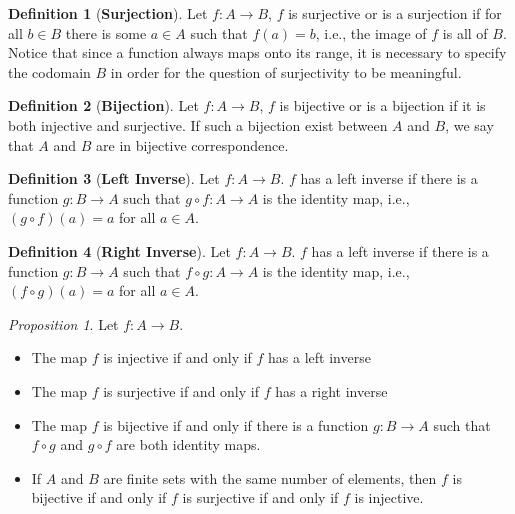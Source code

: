 \documentclass[paper=a4, fontsize=11pt]{scrartcl}
\numberwithin{equation}{section}		%
\numberwithin{figure}{section}			%
\numberwithin{table}{section}				%
\renewcommand{\to}{\ensuremath{\rightarrow}}
\theoremstyle{definition}
\newtheorem{definition}{Definition}[section]
\theoremstyle{remark}
\theoremstyle{example}
\newtheorem{prop}{Proposition}[section]
\begin{document}
\begin{definition}[\textbf{Surjection}]
    Let $f: A \to B$, $f$ is surjective or is a surjection if for all $b \in B$ there is some $a \in A$ such that $f(a) = b$, i.e., the image of $f$ is all of $B$. Notice that since a function always maps onto its range, it is necessary to specify the codomain $B$ in order for the question of surjectivity to be meaningful.
\end{definition}

\begin{definition}[\textbf{Bijection}]
    Let $f: A \to B$, $f$ is bijective or is a bijection if it is both injective and surjective. If such a bijection exist between $A$ and $B$, we say that $A$ and $B$ are in bijective correspondence.
\end{definition}

\begin{definition}[\textbf{Left Inverse}]
    Let $f: A \to B$. $f$ has a left inverse if there is a function $g: B \to A$ such that $g \circ f: A \to A$ is the identity map, i.e., $(g \circ f)(a) = a$ for all $a \in A$. 
\end{definition}

\begin{definition}[\textbf{Right Inverse}]
    Let $f: A \to B$. $f$ has a left inverse if there is a function $g: B \to A$ such that $f \circ g: A \to A$ is the identity map, i.e., $(f \circ g)(a) = a$ for all $a \in A$. 
\end{definition}

\begin{prop}
    Let $f: A \to B$.
    \begin{itemize}
        \item The map $f$ is injective if and only if $f$ has a left inverse
        \item The map $f$ is surjective if and only if $f$ has a right inverse
        \item The map $f$ is bijective if and only if there is a function $g: B \to A$ such that $f \circ g$ and $g \circ f$ are both identity maps.
        \item If $A$ and $B$ are finite sets with the same number of elements, then $f$ is bijective if and only if $f$ is surjective if and only if $f$ is injective.
    \end{itemize}
\end{prop}
\end{document}
